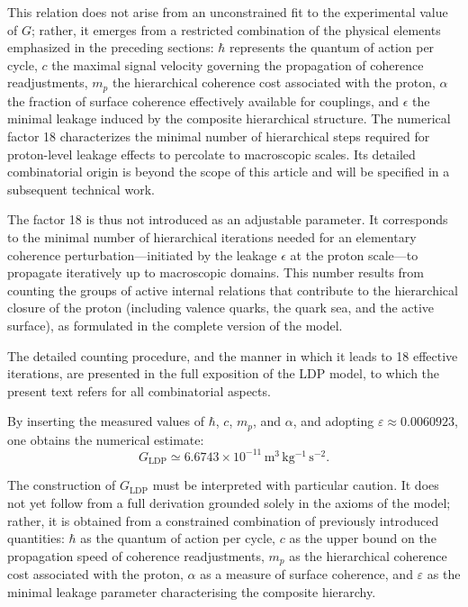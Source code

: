 \documentclass[11pt,a4paper]{article}
\begin{document}
This relation does not arise from an unconstrained fit to the experimental value of \(G\); rather, it emerges from a restricted combination of the physical elements emphasized in the preceding sections: \(\hbar\) represents the quantum of action per cycle, \(c\) the maximal signal velocity governing the propagation of coherence readjustments, \(m_p\) the hierarchical coherence cost associated with the proton, \(\alpha\) the fraction of surface coherence effectively available for couplings, and \(\epsilon\) the minimal leakage induced by the composite hierarchical structure. The numerical factor 18 characterizes the minimal number of hierarchical steps required for proton-level leakage effects to percolate to macroscopic scales. Its detailed combinatorial origin is beyond the scope of this article and will be specified in a subsequent technical work.

The factor 18 is thus not introduced as an adjustable parameter. It corresponds to the minimal number of hierarchical iterations needed for an elementary coherence perturbation—initiated by the leakage \(\epsilon\) at the proton scale—to propagate iteratively up to macroscopic domains. This number results from counting the groups of active internal relations that contribute to the hierarchical closure of the proton (including valence quarks, the quark sea, and the active surface), as formulated in the complete version of the model.

The detailed counting procedure, and the manner in which it leads to 18 effective iterations, are presented in the full exposition of the LDP model, to which the present text refers for all combinatorial aspects.

By inserting the measured values of \(\hbar\), \(c\), \(m_p\), and \(\alpha\), and adopting \(\varepsilon \approx 0.0060923\), one obtains the numerical estimate:
\[
G_{\mathrm{LDP}} \simeq 6.6743 \times 10^{-11}\,\mathrm{m^{3}\,kg^{-1}\,s^{-2}}.
\]

The construction of \(G_{\mathrm{LDP}}\) must be interpreted with particular caution. It does not yet follow from a full derivation grounded solely in the axioms of the model; rather, it is obtained from a constrained combination of previously introduced quantities: \(\hbar\) as the quantum of action per cycle, \(c\) as the upper bound on the propagation speed of coherence readjustments, \(m_p\) as the hierarchical coherence cost associated with the proton, \(\alpha\) as a measure of surface coherence, and \(\varepsilon\) as the minimal leakage parameter characterising the composite hierarchy.
\end{document}
